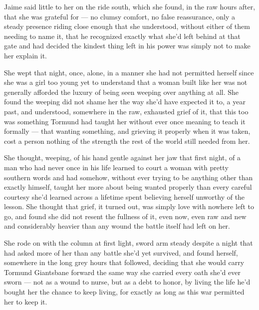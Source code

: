 Jaime said little to her on the ride south, which she found, in the raw hours after, that she was grateful for — no clumsy comfort, no false reassurance, only a steady presence riding close enough that she understood, without either of them needing to name it, that he recognized exactly what she’d left behind at that gate and had decided the kindest thing left in his power was simply not to make her explain it.

She wept that night, once, alone, in a manner she had not permitted herself since she was a girl too young yet to understand that a woman built like her was not generally afforded the luxury of being seen weeping over anything at all. She found the weeping did not shame her the way she’d have expected it to, a year past, and understood, somewhere in the raw, exhausted grief of it, that this too was something Tormund had taught her without ever once meaning to teach it formally — that wanting something, and grieving it properly when it was taken, cost a person nothing of the strength the rest of the world still needed from her.

She thought, weeping, of his hand gentle against her jaw that first night, of a man who had never once in his life learned to court a woman with pretty southern words and had somehow, without ever trying to be anything other than exactly himself, taught her more about being wanted properly than every careful courtesy she’d learned across a lifetime spent believing herself unworthy of the lesson. She thought that grief, it turned out, was simply love with nowhere left to go, and found she did not resent the fullness of it, even now, even raw and new and considerably heavier than any wound the battle itself had left on her.

She rode on with the column at first light, sword arm steady despite a night that had asked more of her than any battle she’d yet survived, and found herself, somewhere in the long grey hours that followed, deciding that she would carry Tormund Giantsbane forward the same way she carried every oath she’d ever sworn — not as a wound to nurse, but as a debt to honor, by living the life he’d bought her the chance to keep living, for exactly as long as this war permitted her to keep it.